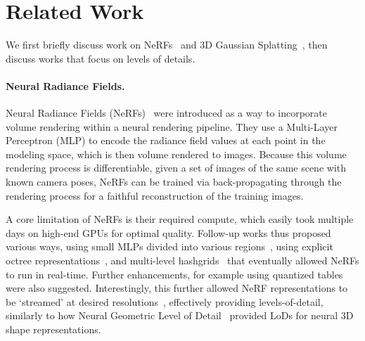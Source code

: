 
\section{Related Work}

  We first briefly discuss work on NeRFs~\cite{mildenhall2020nerf} and 3D
  Gaussian Splatting~\cite{kerbl20233d}, then discuss works that focus on levels
  of details.

  \paragraph{Neural Radiance Fields.}
    Neural Radiance Fields (NeRFs)~\cite{mildenhall2020nerf} were introduced as a
    way to incorporate volume rendering within a neural rendering pipeline.
    They use a Multi-Layer Perceptron (MLP) to encode the radiance field values at
    each point in the modeling space, which is then volume rendered to images.
    Because this volume rendering process is differentiable, given a set of images
    of the same scene with known camera poses, NeRFs can be trained via
    back-propagating through the rendering process for a faithful reconstruction
    of the training images.

    A core limitation of NeRFs is their required compute, which easily took
    multiple days on high-end GPUs for optimal quality.
    Follow-up works thus proposed various ways, using small MLPs divided into
    various regions~\cite{garbin2021fastnerf}, using explicit octree
    representations~\cite{yu2021plenoctrees,fridovich2022plenoxels}, and
    multi-level hashgrids~\cite{mueller2022instant} that eventually allowed NeRFs
    to run in real-time.
    Further enhancements, for example using quantized
    tables~\cite{takikawa2022variable} were also suggested.
    Interestingly, this further allowed NeRF representations to be `streamed' at
    desired resolutions~\cite{reiser2023merf,duckworth2024smerf}, effectively
    providing levels-of-detail, similarly to how Neural Geometric Level of
    Detail~\cite{takikawa2021neural} provided LoDs for neural 3D shape
    representations.

